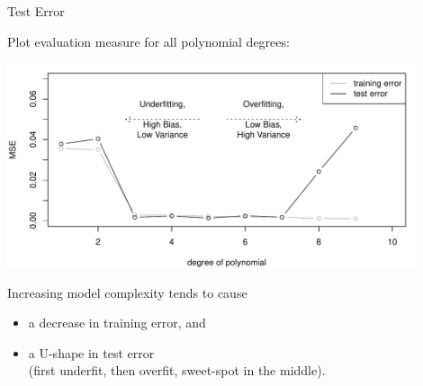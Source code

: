 \begin{vbframe}{Test Error}

Plot evaluation measure for all polynomial degrees:

\includegraphics[width=0.9\textwidth]{figure/eval_test_3} 

Increasing model complexity tends to cause

\begin{itemize}
  \item a decrease in training error, and\\
  \item a U-shape in test error\\ 
  (first underfit, then overfit, sweet-spot in the middle).
  \end{itemize}
  
\end{vbframe}


